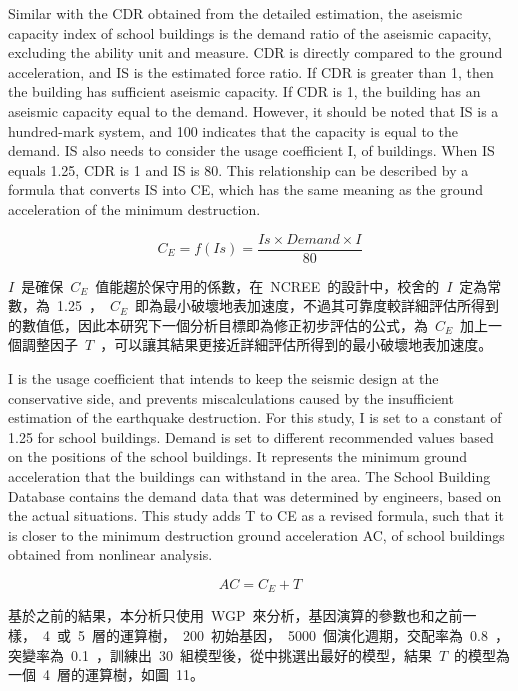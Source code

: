 Similar with the CDR obtained from the detailed estimation, the aseismic capacity index of school buildings is the demand ratio of the aseismic capacity, excluding the ability unit and measure. CDR is directly compared to the ground acceleration, and IS is the estimated force ratio. If CDR is greater than 1, then the building has sufficient aseismic capacity. If CDR is 1, the building has an aseismic capacity equal to the demand. However, it should be noted that IS is a hundred-mark system, and 100 indicates that the capacity is equal to the demand. IS also needs to consider the usage coefficient I, of buildings. When IS equals 1.25, CDR is 1 and IS is 80. This relationship can be described by a formula that converts IS into CE, which has the same meaning as the ground acceleration of the minimum destruction.

\begin{equation} C_E = f(Is) = \dfrac{Is \times Demand \times I}{80}  \label{eq:CE}\end{equation}

$I$~是確保~$C_E$~值能趨於保守用的係數，在~NCREE~的設計中，校舍的~$I$~定為常數，為~1.25~，~$C_E$~即為最小破壞地表加速度，不過其可靠度較詳細評估所得到的數值低，因此本研究下一個分析目標即為修正初步評估的公式，為~$C_E$~加上一個調整因子~$T$~，可以讓其結果更接近詳細評估所得到的最小破壞地表加速度。

I is the usage coefficient that intends to keep the seismic design at the conservative side, and prevents miscalculations caused by the insufficient estimation of the earthquake destruction. For this study, I is set to a constant of 1.25 for school buildings. Demand is set to different recommended values based on the positions of the school buildings. It represents the minimum ground acceleration that the buildings can withstand in the area. The School Building Database contains the demand data that was determined by engineers, based on the actual situations. This study adds T to CE as a revised formula, such that it is closer to the minimum destruction ground acceleration AC, of school buildings obtained from nonlinear analysis.

\begin{equation} AC = C_E + T  \label{eq:AC}\end{equation}

基於之前的結果，本分析只使用~WGP~來分析，基因演算的參數也和之前一樣，~4~或~5~層的運算樹，~200~初始基因，~5000~個演化週期，交配率為~0.8~，突變率為~0.1~，訓練出~30~組模型後，從中挑選出最好的模型，結果~$T$~的模型為一個~4~層的運算樹，如圖~11。


